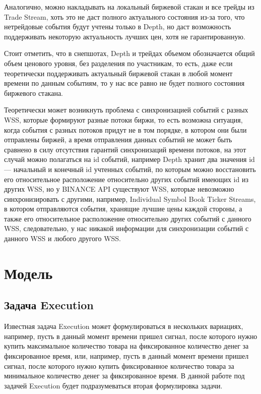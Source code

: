 \documentclass[12pt, a4paper]{article}
\begin{document}
Аналогично, можно накладывать на локальный биржевой стакан и все трейды из Trade Stream, хоть это не даст полного актуального состояния из-за того, что нетрейдовые события будут учтены только в Depth, но даст возможность поддерживать некоторую актуальность лучших цен, хотя не гарантированную. 

Стоит отметить, что в снепшотах, Depth и трейдах объемом обозначается общий объем ценового уровня, без разделения по участникам, то есть, даже если теоретически поддерживать актуальный биржевой стакан в любой момент времени по данным событиям, то у нас все равно не будет полного состояния биржевого стакана.

Теоретически может возникнуть проблема с синхронизацией событий с разных WSS, которые формируют разные потоки биржи, то есть возможна ситуация, когда события с разных потоков придут не в том порядке, в котором они были отправлены биржей, а время отправления данных событий не может быть сравнено в силу отсутствия гарантий синхронизаций времени потоков, на этот случай можно полагаться на id событий, например Depth хранит два значения id --- начальный и конечный id учтенных событий, по которым можно восстановить его относительное расположение относительно других событий имеющих id из других WSS, но у BINANCE API существуют WSS, которые невозможно синхронизировать с другими, например, Individual Symbol Book Ticker Streams, в котором отправляются события, хранящие лучшие цены каждой стороны, а также его относительное расположение относительно других событий с данного WSS, следовательно, у нас никакой информации для синхронизации событий с данного WSS и любого другого WSS.

\section{Модель}

\subsection{Задача Execution}

Известная задача Execution может формулироваться в нескольких вариациях, например, пусть в данный момент времени пришел сигнал, после которого нужно купить максимальное количество товара на фиксированное количество денег за фиксированное время, или, например, пусть в данный момент времени пришел сигнал, после которого нужно купить фиксированное количество товара за минимальное количество денег за фиксированное время. В данной работе под задачей Execution будет подразумеваться вторая формулировка задачи.
\end{document}
